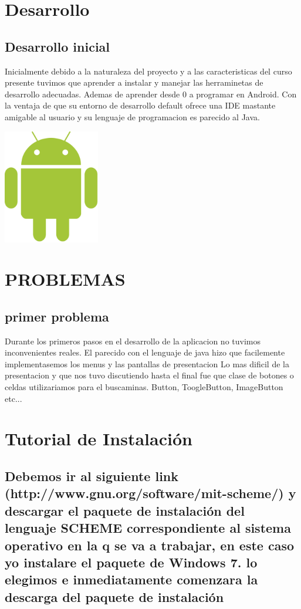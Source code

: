 \documentclass[11pt]{article} %
\begin{document}
\section{Desarrollo}
\subsection{Desarrollo inicial}
Inicialmente debido  a la naturaleza del proyecto y a las caracteristicas del curso presente tuvimos que aprender a instalar y manejar las herraminetas de desarrollo adecuadas. Ademas de aprender desde 0 a programar en Android. Con la ventaja de que su entorno de desarrollo default ofrece una IDE mastante amigable al usuario y su lenguaje de programacion es parecido al Java. 

\includegraphics[height=5cm]{imagenes/Android_robot.png}
\section{PROBLEMAS }


\subsection{primer problema}

Durante los primeros pasos en el desarrollo de la aplicacion no tuvimos inconvenientes reales. El parecido con el lenguaje de java hizo que facilemente implementasemos los menus y las pantallas de presentacion
Lo mas dificil de la presentacion y que nos tuvo discutiendo hasta el final fue que clase de botones o celdas utilizariamos para el buscaminas. Button, ToogleButton, ImageButton etc...

\section{Tutorial de Instalación}
\subsection{Debemos ir al siguiente link (http://www.gnu.org/software/mit-scheme/) y descargar el paquete de instalación del lenguaje SCHEME correspondiente al sistema operativo en la q se va a trabajar, en este caso yo instalare el paquete de Windows 7.
lo elegimos e inmediatamente comenzara la descarga del paquete de instalación}
\begin{center}
\end{center}
\end{document}
